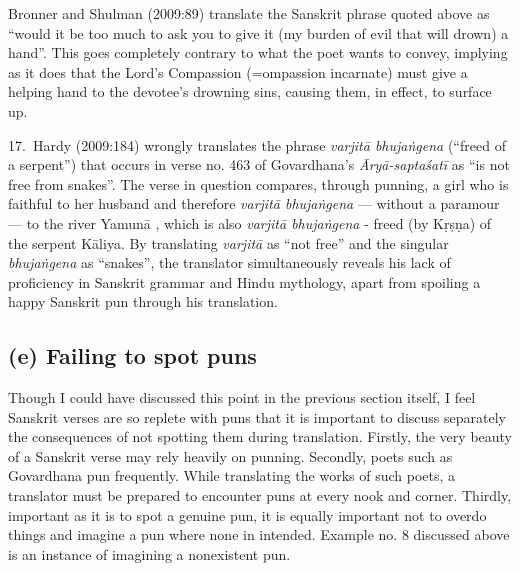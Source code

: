 Bronner and Shulman (2009:89) translate the Sanskrit phrase quoted above as “would it be too much to ask you to give it (my burden of evil that will drown) a hand”. This goes completely contrary to what the poet wants to convey, implying as it does that the Lord’s Compassion (=ompassion incarnate) must give a helping hand to the devotee’s drowning sins, causing them, in effect, to surface up. 

17.~Hardy (2009:184) wrongly translates the phrase \textsl{varjitā bhujaṅgena} (“freed of a serpent”) that occurs in verse no. 463 of Govardhana’s \textsl{Āryā-saptaśatī} as “is not free from snakes”. The verse in question compares, through punning, a girl who is faithful to her husband and therefore \textsl{varjitā bhujaṅgena} --- without a paramour --- to the river Yamunā , which is also \textsl{varjitā bhujaṅgena } -  freed (by Kṛṣṇa) of the serpent Kāliya. By translating \textsl{varjitā} as “not free” and the singular \textsl{bhujaṅgena} as “snakes”, the translator simultaneously reveals his lack of proficiency in Sanskrit grammar and Hindu mythology, apart from spoiling a happy Sanskrit pun through his translation. 

\subsection*{(e) Failing to spot puns}

Though I could have discussed this point in the previous section itself, I feel Sanskrit verses are so replete with puns that it is important to discuss separately the consequences of not spotting them during translation. Firstly, the very beauty of a Sanskrit verse may rely heavily on punning. Secondly, poets such as Govardhana pun frequently. While translating the works of such poets, a translator must be prepared to encounter puns at every nook and corner. Thirdly, important as it is to spot a genuine pun, it is equally important not to overdo things and imagine a pun where none in intended. Example no. 8 discussed above is an instance of imagining a nonexistent pun. 

